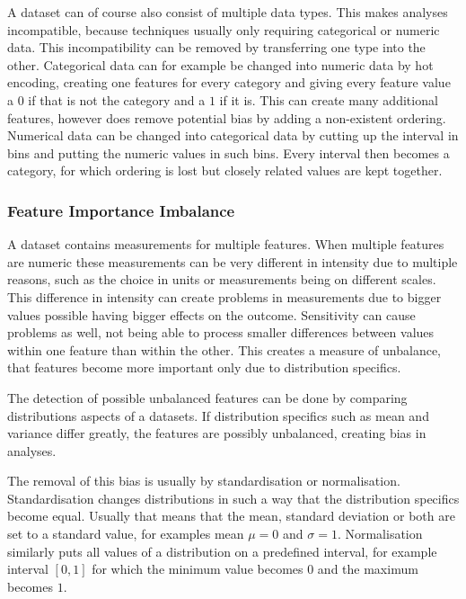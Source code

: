 \documentclass[10pt,a4paper]{article}
\begin{document}
	A dataset can of course also consist of multiple data types. This makes analyses incompatible, because techniques usually only requiring categorical or numeric data. This incompatibility can be removed by transferring one type into the other. Categorical data can for example be changed into numeric data by hot encoding\cite{guo2016entity}, creating one features for every category and giving every feature value a $0$ if that is not the category and a $1$ if it is. This can create many additional features, however does remove potential bias by adding a non-existent ordering. Numerical data can be changed into categorical data by cutting up the interval in bins and putting the numeric values in such bins\cite{larose2014discovering}. Every interval then becomes a category, for which ordering is lost but closely related values are kept together.  
	
	\subsubsection{Feature Importance Imbalance}
	\label{subsec:Normalisation}
	
	A dataset contains measurements for multiple features. When multiple features are numeric these measurements can be very different in intensity due to multiple reasons, such as the choice in units or measurements being on different scales. This difference in intensity can create problems in measurements due to bigger values possible having bigger effects on the outcome. Sensitivity can cause problems as well, not being able to process smaller differences between values within one feature than within the other. This creates a measure of unbalance, that features become more important only due to distribution specifics\cite{al2006normalization, patro2015normalization}. 
	
	The detection of possible unbalanced features can be done by comparing distributions aspects of a datasets. If distribution specifics such as mean and variance differ greatly, the features are possibly unbalanced, creating bias in analyses. 
	
	The removal of this bias is usually by standardisation or normalisation. Standardisation changes distributions in such a way that the distribution specifics become equal. Usually that means that the mean, standard deviation or both are set to a standard value, for examples mean $\mu = 0$ and $\sigma = 1$. Normalisation similarly puts all values of a distribution on a predefined interval, for example interval $[0, 1]$ for which the minimum value becomes $0$ and the maximum becomes $1$\cite{al2006normalization, patro2015normalization}. 
	
\end{document}
